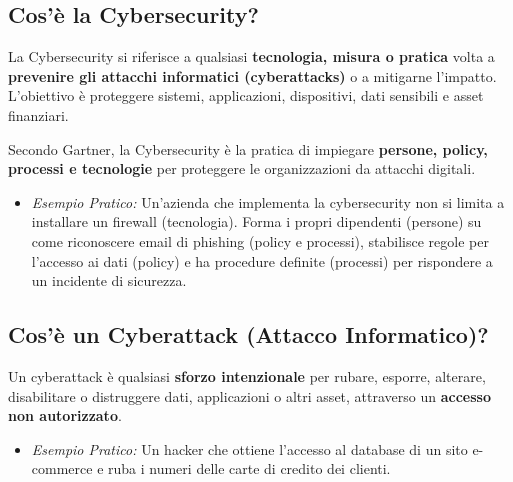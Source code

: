 \subsection{Cos'è la Cybersecurity?}
La Cybersecurity si riferisce a qualsiasi \textbf{tecnologia, misura o pratica} volta a \textbf{prevenire gli attacchi informatici (cyberattacks)} o a mitigarne l'impatto.
L'obiettivo è proteggere sistemi, applicazioni, dispositivi, dati sensibili e asset finanziari.

Secondo Gartner, la Cybersecurity è la pratica di impiegare \textbf{persone, policy, processi e tecnologie} per proteggere le organizzazioni da attacchi digitali.
\begin{itemize}
    \item \textit{Esempio Pratico:} Un'azienda che implementa la cybersecurity non si limita a installare un firewall (tecnologia). Forma i propri dipendenti (persone) su come riconoscere email di phishing (policy e processi), stabilisce regole per l'accesso ai dati (policy) e ha procedure definite (processi) per rispondere a un incidente di sicurezza.
\end{itemize}

\subsection{Cos'è un Cyberattack (Attacco Informatico)?}
Un cyberattack è qualsiasi \textbf{sforzo intenzionale} per rubare, esporre, alterare, disabilitare o distruggere dati, applicazioni o altri asset, attraverso un \textbf{accesso non autorizzato}.
\begin{itemize}
    \item \textit{Esempio Pratico:} Un hacker che ottiene l'accesso al database di un sito e-commerce e ruba i numeri delle carte di credito dei clienti.
\end{itemize}

